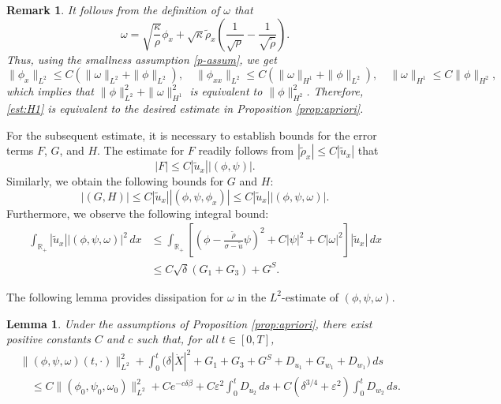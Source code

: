 \documentclass[11pt,reqno]{amsart}
\newtheorem{lemma}{Lemma}[section]
\newtheorem{remark}{Remark}[section]
\numberwithin{equation}{section} %
\begin{document}
\begin{remark}
	It follows from the definition of $\omega$ that
	\[\omega=\sqrt{\frac{\kappa}{\rho}}\phi_x +\sqrt{\kappa}\tilde{\rho}_x\left(\frac{1}{\sqrt{\rho}}-\frac{1}{\sqrt{\tilde{\rho}}}\right).\]
	Thus, using the smallness assumption \eqref{p-assum}, we get
	\[\|\phi_x\|_{L^2}\le C(\|\omega\|_{L^2}+\|\phi\|_{L^2}),\quad \|\phi_{xx}\|_{L^2}\le C(\|\omega\|_{H^1}+\|\phi\|_{L^2}),\quad \|\omega\|_{H^1}\le C\|\phi\|_{H^2}, \]
	which implies that $\|\phi\|_{L^2}^2+\|\omega\|_{H^1}^2$ is equivalent to $\|\phi\|_{H^2}^2$. Therefore, \eqref{est:H1} is equivalent to the desired estimate in Proposition \ref{prop:apriori}.
\end{remark}

For the subsequent estimate, it is necessary to establish bounds for the error terms $F$, $G$, and $H$. The estimate for $F$ readily follows from 
$|\tilde{\rho}_x| \le C|\tilde{u}_x|$ that
\begin{equation*} %
|F| \le C|\tilde{u}_x| |(\phi, \psi)|.
\end{equation*}
Similarly, we obtain the following bounds for $G$ and $H$:
\begin{equation} \label{eq:GH-est}
|(G, H)|\le C|\tilde{u}_x||(\phi,\psi,\phi_x)| \le C|\tilde{u}_x||(\phi,\psi,\omega)|.
\end{equation}
Furthermore, we observe the following integral bound:
\begin{equation} \label{est-quadratic}
\begin{aligned}
\int_{\mathbb{R}_+} |\tilde{u}_x| |(\phi,\psi,\omega)|^2 \, dx 
&\le \int_{\mathbb{R}_+} \left[ \left( \phi-\frac{\tilde{\rho}}{\sigma-\tilde{u}}\psi\right)^2 + C |\psi|^2 + C|\omega|^2 \right] |\tilde{u}_x| \, dx \\
&\le C \sqrt{\delta} (G_1 + G_3) + G^S.
\end{aligned}
\end{equation}

The following lemma provides dissipation for $\omega$ in the $L^2$-estimate of $(\phi,\psi,\omega)$.


\begin{lemma} \label{lem:higeroder-1}
	Under the assumptions of Proposition \ref{prop:apriori}, there exist positive constants $C$ and $c$ such that, for all $t \in [0,T]$,
\begin{equation} \label{est-L2-combined}
\begin{aligned}
    &\|(\phi, \psi, \omega) (t,\cdot)\|_{L^2}^2 + \int_0^t \big(\delta |\dot{X}|^2 + G_1 + G_3 + G^S + D_{u_1} + G_{w_1} + D_{w_1} \big)\,ds\\
    &\quad \leq C \|(\phi_0, \psi_0, \omega_0) \|_{L^2}^2 + Ce^{-c\delta \beta}+ C\varepsilon^2 \int_0^t  D_{u_2} \, ds + C(\delta^{3/4}+\varepsilon^2) \int_0^t  D_{w_2} \, ds.
\end{aligned}
\end{equation}
\end{lemma}
\end{document}
